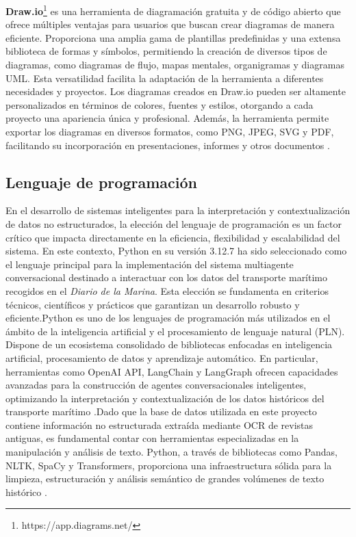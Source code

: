 \textbf{Draw.io}\footnote{https://app.diagrams.net/} es una herramienta de diagramación gratuita y de código abierto que ofrece múltiples ventajas para usuarios que buscan crear diagramas de manera eficiente. Proporciona una amplia gama de plantillas predefinidas y una extensa biblioteca de formas y símbolos, permitiendo la creación de diversos tipos de diagramas, como diagramas de flujo, mapas mentales, organigramas y diagramas UML. Esta versatilidad facilita la adaptación de la herramienta a diferentes necesidades y proyectos. Los diagramas creados en Draw.io pueden ser altamente personalizados en términos de colores, fuentes y estilos, otorgando a cada proyecto una apariencia única y profesional. Además, la herramienta permite exportar los diagramas en diversos formatos, como PNG, JPEG, SVG y PDF, facilitando su incorporación en presentaciones, informes y otros documentos \cite{drawio}.

\subsection{Lenguaje de programación}


En el desarrollo de sistemas inteligentes para la interpretación y contextualización de datos no estructurados, la elección del lenguaje de programación es un factor crítico que impacta directamente en la eficiencia, flexibilidad y escalabilidad del sistema. En este contexto, Python en su versión 3.12.7 ha sido seleccionado como el lenguaje principal para la implementación del sistema multiagente conversacional destinado a interactuar con los datos del transporte marítimo recogidos en el \textit{Diario de la Marina}. Esta elección se fundamenta en criterios técnicos, científicos y prácticos que garantizan un desarrollo robusto y eficiente.Python es uno de los lenguajes de programación más utilizados en el ámbito de la inteligencia artificial y el procesamiento de lenguaje natural (PLN). Dispone de un ecosistema consolidado de bibliotecas enfocadas en inteligencia artificial, procesamiento de datos y aprendizaje automático. En particular, herramientas como OpenAI API, LangChain y LangGraph ofrecen capacidades avanzadas para la construcción de agentes conversacionales inteligentes, optimizando la interpretación y contextualización de los datos históricos del transporte marítimo \cite{langchain2023langgraph}.Dado que la base de datos utilizada en este proyecto contiene información no estructurada extraída mediante OCR de revistas antiguas, es fundamental contar con herramientas especializadas en la manipulación y análisis de texto. Python, a través de bibliotecas como Pandas, NLTK, SpaCy y Transformers, proporciona una infraestructura sólida para la limpieza, estructuración y análisis semántico de grandes volúmenes de texto histórico \cite{bird2009natural, spacy2023nlp}.



